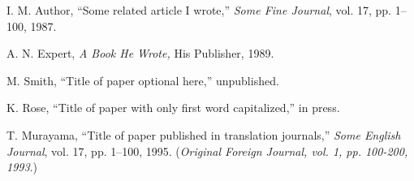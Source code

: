 \begin{thebibliography}{9}
\footnotesize
{}
I. M. Author,
``Some related article I wrote,''
{\em Some Fine Journal}, vol. 17, pp. 1--100, 1987.

A. N. Expert,
{\em A Book He Wrote,}
His Publisher, 1989.

M. Smith,
``Title of paper optional here,''
unpublished.

K. Rose,
``Title of paper with only first word capitalized,''	%
in press.

T. Murayama,
``Title of paper published in translation journals,''	%
{\em Some English Journal}, vol. 17, pp. 1--100, 1995.	%
({\em Original Foreign Journal, vol. 1, pp. 100-200, 1993}.)	%

\end{thebibliography}

